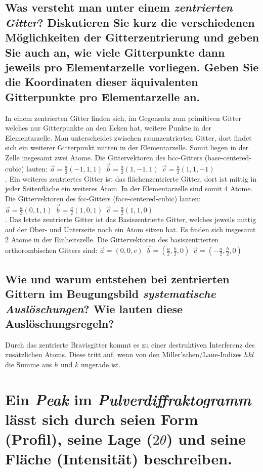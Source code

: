 \subsection*{Was versteht man unter einem \textit{zentrierten Gitter}? Diskutieren Sie kurz die verschiedenen Möglichkeiten der Gitterzentrierung und geben Sie auch an, wie viele Gitterpunkte dann jeweils pro Elementarzelle vorliegen. Geben Sie die Koordinaten dieser äquivalenten Gitterpunkte pro Elementarzelle an.}
In einem zentrierten Gitter finden sich, im Gegensatz zum primitiven Gitter welches nur Gitterpunkte an den Ecken hat, weitere Punkte in der Elementarzelle.
Man unterscheidet zwischen raumzentrierten Gitter, dort findet sich ein weiterer Gitterpunkt mitten in der Elementarzelle.
Somit liegen in der Zelle insgesamt zwei Atome.
Die Gittervektoren des bcc-Gitters (base-centered-cubic) lauten: $\vec{a}=\frac{a}{2}\left(-1,1,1\right)\:\:\vec{b}=\frac{a}{2}\left(1,-1,1\right)\:\:\vec{c}=\frac{a}{2}\left(1,1,-1\right)$\\.
Ein weiteres zentriertes Gitter ist das flächenzentrierte Gitter, dort ist mittig in jeder Seitenfläche ein weiteres Atom.
In der Elementarzelle sind somit 4 Atome.
Die Gittervektoren des fcc-Gitters (face-centered-cubic) lauten: $\vec{a}=\frac{a}{2}\left(0,1,1\right)\:\:\vec{b}=\frac{a}{2}\left(1,0,1\right)\:\:\vec{c}=\frac{a}{2}\left(1,1,0\right)$\\.
Das letzte zentrierte Gitter ist das Basiszentrierte Gitter, welches jeweils mittig auf der Ober- und Unterseite noch ein Atom sitzen hat.
Es finden sich insgesamt 2 Atome in der Einheitszelle.
Die Gittervektoren des basiszentrierten orthorombischen Gitters sind: $\vec{a}=\left(0,0,c\right)\:\:\vec{b}=\left(\frac{a}{2},\frac{b}{2},0\right)\:\:\vec{c}=\left(-\frac{a}{2},\frac{b}{2},0\right)$
\subsection*{Wie und warum entstehen bei zentrierten Gittern im Beugungsbild \textit{systematische Auslöschungen}? Wie lauten diese Auslöschungsregeln?}
Durch das zentrierte Bravisgitter kommt es zu einer destruktiven Interferenz des zusätzlichen Atoms.
Diese tritt auf, wenn von den Miller'schen/Laue-Indizes $hkl$ die Summe aus $h$ und $k$ ungerade ist. \cite{UniFreiburg}
\section[Beschreibung eines Peaks im Pulverdiffraktogramm]{Ein \textit{Peak} im \textit{Pulverdiffraktogramm} lässt sich durch seien Form (Profil), seine Lage \texorpdfstring{($2\theta$)}{2(U+03B8)} und seine Fläche (Intensität) beschreiben.}
